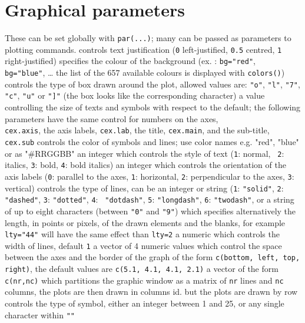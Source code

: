 \section{Graphical parameters}{These can be set globally with {\tt par(...)}; many can be passed as
parameters to plotting commands.}
	{controls text justification ({\tt 0} left-justified, {\tt 0.5}
centred, {\tt 1} right-justified)}
	{specifies the colour of the background (ex. : {\tt bg="red"}, {\tt
bg="blue"}, \ldots{} the list of the 657 available colours is displayed with
{\tt colors()})}
	{controls the type of box drawn around the plot, allowed values
    are: {\tt "o"}, {\tt "l"}, {\tt "7"}, {\tt "c"}, {\tt "u"} or {\tt "]"} (the box looks like the corresponding character)}
	{ a value controlling the size of texts and symbols with respect to
the default; the following parameters have the same control for numbers on the
axes,\\
    {\tt cex.axis}, the axis labels, {\tt cex.lab}, the title, {\tt cex.main},
    and the sub-title, {\tt cex.sub}}
	{controls the color of symbols and lines; use color names e.g. "red", "blue" or as "\#RRGGBB"}
	{an integer which controls the style of text ({\tt 1}: normal, {\tt
2}: italics, {\tt 3}: bold, {\tt 4}: bold italics)}
	{ an integer which controls the orientation of the axis labels ({\tt 0}: parallel to the axes, {\tt 1}: horizontal, {\tt 2}: perpendicular to the axes, {\tt 3}: vertical)}
	{controls the type of lines, can be an integer or string ({\tt 1}:
{\tt "solid"}, {\tt 2}: {\tt "dashed"}, {\tt 3}: {\tt "dotted"}, {\tt 4}: {\tt
"dotdash"}, {\tt 5}: {\tt "longdash"}, {\tt 6}: {\tt "twodash"}, or a string of
up to eight characters (between {\tt "0"} and {\tt "9"}) which specifies
alternatively the length, in points or pixels, of the drawn elements and the
blanks, for example {\tt lty="44"} will have the same effect than {\tt lty=2}}
	{ a numeric which controls the width of lines, default {\tt 1}}
	{ a vector of 4 numeric values which control the space between the
axes and the border of the graph of the form {\tt c(bottom, left, top, right)},
the default values are {\tt c(5.1, 4.1, 4.1, 2.1)}}
	{a vector of the form {\tt c(nr,nc)} which partitions the
graphic window as a matrix of {\tt nr} lines and {\tt nc} columns, the plots
are then drawn in columns}
	{ id. but the plots are drawn by row}
	{ controls the type of symbol, either an integer between 1 and 25,
or any single character within {\tt ""}}

